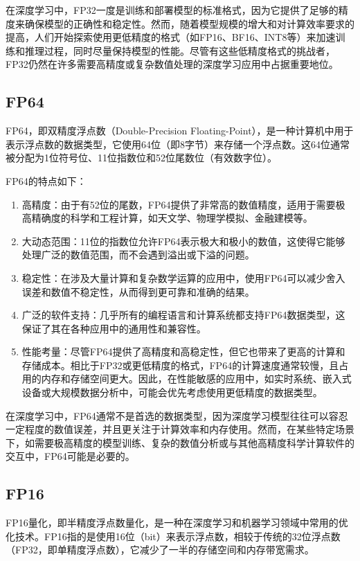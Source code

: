 在深度学习中，FP32一度是训练和部署模型的标准格式，因为它提供了足够的精度来确保模型的正确性和稳定性。然而，随着模型规模的增大和对计算效率要求的提高，人们开始探索使用更低精度的格式（如FP16、BF16、INT8等）来加速训练和推理过程，同时尽量保持模型的性能。尽管有这些低精度格式的挑战者，FP32仍然在许多需要高精度或复杂数值处理的深度学习应用中占据重要地位。

\subsection{FP64}

FP64，即双精度浮点数（Double-Precision Floating-Point），是一种计算机中用于表示浮点数的数据类型，它使用64位（即8字节）来存储一个浮点数。这64位通常被分配为1位符号位、11位指数位和52位尾数位（有效数字位）。

FP64的特点如下：

\begin{enumerate}
	\item 高精度：由于有52位的尾数，FP64提供了非常高的数值精度，适用于需要极高精确度的科学和工程计算，如天文学、物理学模拟、金融建模等。
	\item 大动态范围：11位的指数位允许FP64表示极大和极小的数值，这使得它能够处理广泛的数值范围，而不会遇到溢出或下溢的问题。
	\item 稳定性：在涉及大量计算和复杂数学运算的应用中，使用FP64可以减少舍入误差和数值不稳定性，从而得到更可靠和准确的结果。
	\item 广泛的软件支持：几乎所有的编程语言和计算系统都支持FP64数据类型，这保证了其在各种应用中的通用性和兼容性。
	\item 性能考量：尽管FP64提供了高精度和高稳定性，但它也带来了更高的计算和存储成本。相比于FP32或更低精度的格式，FP64的计算速度通常较慢，且占用的内存和存储空间更大。因此，在性能敏感的应用中，如实时系统、嵌入式设备或大规模数据分析中，可能会优先考虑使用更低精度的数据类型。
\end{enumerate}

在深度学习中，FP64通常不是首选的数据类型，因为深度学习模型往往可以容忍一定程度的数值误差，并且更关注于计算效率和内存使用。然而，在某些特定场景下，如需要极高精度的模型训练、复杂的数值分析或与其他高精度科学计算软件的交互中，FP64可能是必要的。

\subsection{FP16}

FP16量化，即半精度浮点数量化，是一种在深度学习和机器学习领域中常用的优化技术。FP16指的是使用16位（bit）来表示浮点数，相较于传统的32位浮点数（FP32，即单精度浮点数），它减少了一半的存储空间和内存带宽需求。

